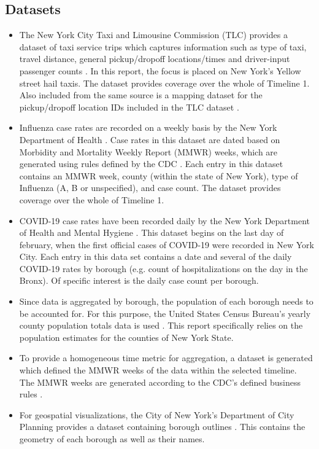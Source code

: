 \documentclass[11pt]{article}
\begin{document}
\subsection{Datasets}
\begin{itemize}
    \item The New York City Taxi and Limousine Commission (TLC) provides a dataset of taxi service trips which captures information such as type of taxi, travel distance, general pickup/dropoff locations/times and driver-input passenger counts \cite{tlcdataset}. 
In this report, the focus is placed on New York's Yellow street hail taxis. The dataset provides coverage over the whole of Timeline 1.
Also included from the same source is a mapping dataset for the pickup/dropoff location IDs included in the TLC dataset \cite{tlcdataset}.
    \item Influenza case rates are recorded on a weekly basis by the New York Department of Health \cite{fludataset}. 
Case rates in this dataset are dated based on Morbidity and Mortality Weekly Report (MMWR) weeks, which are generated using rules defined by the CDC \cite{mmwr}.
Each entry in this dataset contains an MMWR week, county (within the state of New York), type of Influenza (A, B or unspecified), and case count.
The dataset provides coverage over the whole of Timeline 1.
    \item COVID-19 case rates have been recorded daily by the New York Department of Health and Mental Hygiene \cite{coviddataset}.
This dataset begins on the last day of february, when the first official cases of COVID-19 were recorded in New York City. 
Each entry in this data set contains a date and several of the daily COVID-19 rates by borough (e.g. count of hospitalizations on the day in the Bronx).
Of specific interest is the daily case count per borough.
    \item Since data is aggregated by borough, the population of each borough needs to be accounted for.
    For this purpose, the United States Census Bureau's yearly county population totals data is used \cite{populations2019, populations2020}.
    This report specifically relies on the population estimates for the counties of New York State.
    \item To provide a homogeneous time metric for aggregation, a dataset is generated which defined the MMWR weeks of the data within the selected timeline.
    The MMWR weeks are generated according to the CDC's defined business rules \cite{mmwr}.
    \item For geospatial visualizations, 
    the City of New York's Department of City Planning provides a dataset containing borough outlines \cite{boroughdataset}.
    This contains the geometry of each borough as well as their names.
\end{itemize}
\end{document}

